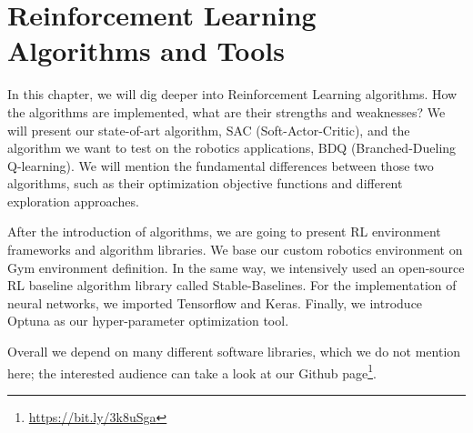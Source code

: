 \chapter{Reinforcement Learning Algorithms and Tools}\label{chapter:reinforcement_learning}

In this chapter, we will dig deeper into Reinforcement Learning algorithms. How the algorithms are implemented, what are their strengths and weaknesses? We will present our state-of-art algorithm, SAC (Soft-Actor-Critic), and the algorithm we want to test on the robotics applications, BDQ (Branched-Dueling Q-learning). We will mention the fundamental differences between those two algorithms, such as their optimization objective functions and different exploration approaches. 

After the introduction of algorithms, we are going to present RL environment frameworks and algorithm libraries. We base our custom robotics environment on Gym environment definition. In the same way, we intensively used an open-source RL baseline algorithm library called Stable-Baselines. For the implementation of neural networks, we imported Tensorflow and Keras. Finally, we introduce Optuna as our hyper-parameter optimization tool. 

Overall we depend on many different software libraries, which we do not mention here; the interested audience can take a look at our Github page\footnote{\url{https://bit.ly/3k8uSga}}.








% 